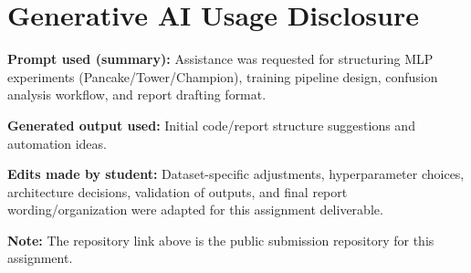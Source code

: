 \documentclass[11pt,a4paper]{article}
\begin{document}
\section{Generative AI Usage Disclosure}
\textbf{Prompt used (summary):} Assistance was requested for structuring MLP experiments (Pancake/Tower/Champion), training pipeline design, confusion analysis workflow, and report drafting format.

\textbf{Generated output used:} Initial code/report structure suggestions and automation ideas.

\textbf{Edits made by student:} Dataset-specific adjustments, hyperparameter choices, architecture decisions, validation of outputs, and final report wording/organization were adapted for this assignment deliverable.

\vspace{0.5cm}
\noindent\textbf{Note:} The repository link above is the public submission repository for this assignment.
\end{document}
